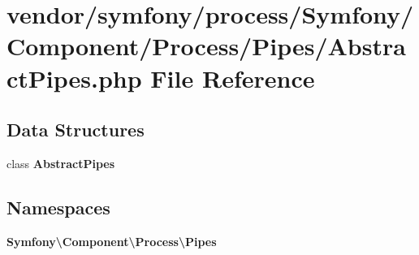 \section{vendor/symfony/process/\+Symfony/\+Component/\+Process/\+Pipes/\+Abstract\+Pipes.php File Reference}
\label{_abstract_pipes_8php}
\subsection*{Data Structures}
\begin{DoxyCompactItemize}
\item 
class {\bf Abstract\+Pipes}
\end{DoxyCompactItemize}
\subsection*{Namespaces}
\begin{DoxyCompactItemize}
\item 
 {\bf Symfony\textbackslash{}\+Component\textbackslash{}\+Process\textbackslash{}\+Pipes}
\end{DoxyCompactItemize}
